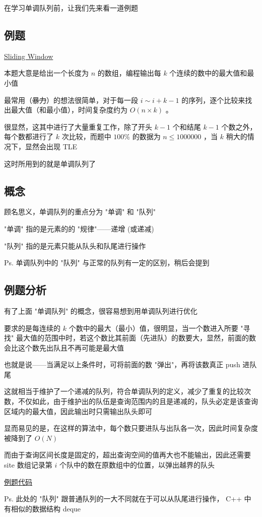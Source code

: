 
在学习单调队列前，让我们先来看一道例题

\subsection{例题}

\href{http://poj.org/problem?id=2823}{Sliding Window}

本题大意是给出一个长度为 $n$ 的数组，编程输出每 $k$ 个连续的数中的最大值和最小值

最常用（\sout{暴力}）的想法很简单，对于每一段 $i \sim i+k-1$ 的序列，逐个比较来找出最大值（和最小值），时间复杂度约为 $O(n \times k)$ 。

很显然，这其中进行了大量重复工作，除了开头 $k-1$ 个和结尾 $k-1$ 个数之外，每个数都进行了 $k$ 次比较，而题中 $100\%$ 的数据为 $n \le 1000000$ ，当 $k$ 稍大的情况下，显然会出现 TLE

这时所用到的就是单调队列了

\subsection{概念}

顾名思义，单调队列的重点分为 "单调" 和 "队列"

"单调" 指的是元素的的 "规律"——递增 (或递减)

"队列" 指的是元素只能从队头和队尾进行操作

Ps. 单调队列中的 "队列" 与正常的队列有一定的区别，稍后会提到

\subsection{例题分析}

有了上面 "单调队列" 的概念，很容易想到用单调队列进行优化

要求的是每连续的 $k$ 个数中的最大（最小）值，很明显，当一个数进入所要 "寻找" 最大值的范围中时，若这个数比其前面（先进队）的数要大，显然，前面的数会比这个数先出队且不再可能是最大值

也就是说——当满足以上条件时，可将前面的数 "弹出"，再将该数真正 push 进队尾

这就相当于维护了一个递减的队列，符合单调队列的定义，减少了重复的比较次数，不仅如此，由于维护出的队伍是查询范围内的且是递减的，队头必定是该查询区域内的最大值，因此输出时只需输出队头即可

显而易见的是，在这样的算法中，每个数只要进队与出队各一次，因此时间复杂度被降到了 $O(N)$

而由于查询区间长度是固定的，超出查询空间的值再大也不能输出，因此还需要 site 数组记录第 $i$ 个队中的数在原数组中的位置，以弹出越界的队头

\href{https://www.luogu.org/paste/dze1lw3b}{例题代码}

Ps. 此处的 "队列" 跟普通队列的一大不同就在于可以从队尾进行操作， C++ 中有相似的数据结构 deque
